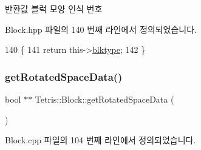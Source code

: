 \begin{DoxyReturn}{반환값}
블럭 모양 인식 번호 
\end{DoxyReturn}


Block.\+hpp 파일의 140 번째 라인에서 정의되었습니다.


\begin{DoxyCode}
140                               \{
141                 \textcolor{keywordflow}{return} this->\hyperlink{class_tetris_1_1_block_aceac58dcf8d8afaa82c2bab101cb3cff}{blktype};
142             \}
\end{DoxyCode}
\mbox{\label{class_tetris_1_1_block_a464ed776185993ad827f316a08969960}} 
\subsubsection{\texorpdfstring{get\+Rotated\+Space\+Data()}{getRotatedSpaceData()}\hspace{0.1cm}{\footnotesize\ttfamily [1/2]}}
{\footnotesize\ttfamily bool $\ast$$\ast$ Tetris\+::\+Block\+::get\+Rotated\+Space\+Data (\begin{DoxyParamCaption}{ }\end{DoxyParamCaption})}



Block.\+cpp 파일의 104 번째 라인에서 정의되었습니다.


